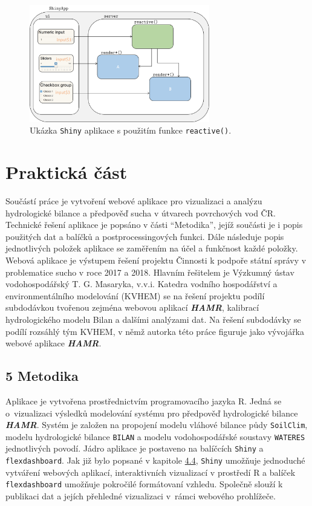 \documentclass[12pt,]{article}
\begin{document}
\begin{figure}[H]
  \centering
      \includegraphics[width=0.7\textwidth]{fig/shiny}
      \caption{Ukázka \texttt{Shiny} aplikace s použitím funkce \texttt{reactive()}.} 
      \label{fig:ch4.4}
\end{figure}

\section*{Praktická část}\label{prakticka-cast}

\qquad Součástí práce je vytvoření webové aplikace pro vizualizaci a
analýzu hydrologické bilance a předpověď sucha v útvarech povrchových
vod ČR. Technické řešení aplikace je popsáno v části \enquote{Metodika},
jejíž součásti je i popis použitých dat a balíčků a postprocessingových
funkci. Dále následuje popis jednotlivých položek aplikace se zaměřením
na účel a funkčnost každé položky. Webová aplikace je výstupem řešení
projektu Činnosti k podpoře státní správy v problematice sucho v roce
2017 a 2018. Hlavním řešitelem je Výzkumný ústav vodohospodářský T. G.
Masaryka, v.v.i. Katedra vodního hospodářství a environmentálního
modelování (KVHEM) se na řešení projektu podílí subdodávkou tvořenou
zejména webovou aplikací \textbf{\emph{HAMR}}, kalibrací hydrologického
modelu Bilan a dalšími analýzami dat. Na řešení subdodávky se podílí
rozsáhlý tým KVHEM, v němž autorka této práce figuruje jako vývojářka
webové aplikace \textbf{\emph{HAMR}}.

\subsection{5 Metodika}\label{metodika}

\qquad Aplikace je vytvořena prostřednictvím programovacího jazyka R.
Jedná se o~vizualizaci výsledků modelování systému pro předpověď
hydrologické bilance \textbf{\emph{HAMR}}. Systém je založen na
propojení modelu vláhové bilance půdy \texttt{SoilClim}, modelu
hydrologické bilance \texttt{BILAN} a modelu vodohospodářské soustavy
\texttt{WATERES} jednotlivých povodí. Jádro aplikace je postaveno na
balíčcích \texttt{Shiny} a \texttt{flexdashboard}. Jak již bylo popsané
v kapitole \protect\hyperlink{webviz}{4.4}, \texttt{Shiny} umožňuje
jednoduché vytváření webových aplikací, interaktivních vizualizací v
prostředí R a balíček \texttt{flexdashboard} umožňuje pokročilé
formátovaní vzhledu. Společně slouží k publikaci dat a jejích přehledné
vizualizaci v~rámci webového prohlížeče.
\end{document}
